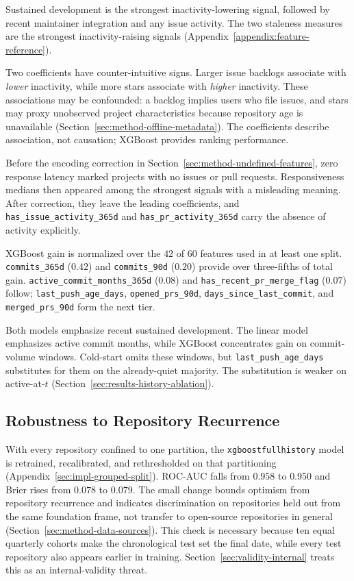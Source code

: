 Sustained development is the strongest inactivity-lowering signal, followed by
recent maintainer integration and any issue activity. The two staleness measures
are the strongest inactivity-raising signals
(Appendix~\ref{appendix:feature-reference}).

Two coefficients have counter-intuitive signs. Larger issue backlogs associate
with \emph{lower} inactivity, while more stars associate with \emph{higher}
inactivity. These
associations may be confounded: a backlog implies users who file issues, and
stars may proxy unobserved project characteristics because repository age is
unavailable (Section~\ref{sec:method-offline-metadata}). The coefficients
describe association, not causation; XGBoost provides ranking performance.

Before the encoding correction in
Section~\ref{sec:method-undefined-features}, zero response latency marked projects
with no issues or pull requests. Responsiveness medians then appeared among the
strongest signals with a misleading meaning. After correction, they leave the
leading coefficients, and \texttt{has\_issue\_activity\_365d} and
\texttt{has\_pr\_activity\_365d} carry the absence of activity explicitly.

XGBoost gain is normalized over the \(42\) of \(60\) features used in at least
one split. \texttt{commits\_365d} (\(0.42\)) and
\texttt{commits\_90d} (\(0.20\)) provide over three-fifths of total gain.
\texttt{active\_commit\_months\_365d} (\(0.08\)) and
\texttt{has\_recent\_pr\_merge\_flag} (\(0.07\)) follow;
\texttt{last\_push\_age\_days}, \texttt{opened\_prs\_90d},
\texttt{days\_since\_last\_commit}, and \texttt{merged\_prs\_90d} form the next
tier.

Both models emphasize recent sustained development. The linear model emphasizes
active commit months, while XGBoost concentrates gain on commit-volume windows.
Cold-start omits these windows, but \texttt{last\_push\_age\_days} substitutes
for them on the already-quiet majority. The substitution is weaker on
active-at-\(t\) (Section~\ref{sec:results-history-ablation}).

\subsection{Robustness to Repository Recurrence}
\label{sec:results-robustness}

With every repository confined to one partition, the
\texttt{xgboost\sdash full\sdash history} model is retrained,
recalibrated, and rethresholded on that partitioning
(Appendix~\ref{sec:impl-grouped-split}). ROC-AUC falls from \(0.958\) to
\(0.950\) and Brier rises from \(0.078\) to \(0.079\). The small change bounds
optimism from repository recurrence and indicates discrimination on repositories
held out from the same foundation frame, not transfer to open-source
repositories in general (Section~\ref{sec:method-data-sources}). This check is
necessary because ten equal quarterly cohorts make the chronological test set the
final date, while every test repository also appears earlier in training.
Section~\ref{sec:validity-internal} treats this as an internal-validity threat.

